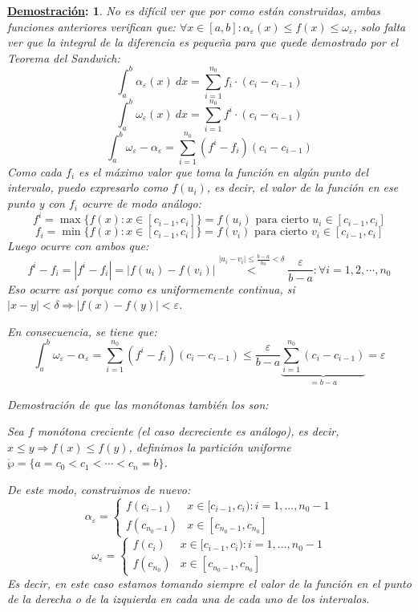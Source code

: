 \documentclass[10pt,a4paper,openright]{book}
\theoremstyle{break}
\newtheorem*{demo}{\underline{Demostración}:}
\newcommand{\dif}[1]{\ d#1}
\begin{document}
\begin{demo}
No es difícil ver que por como están construidas, ambas funciones anteriores verifican que: $\forall x\in[a,b]: \alpha_\varepsilon (x)\leq f(x)\leq \omega_\varepsilon$, solo falta ver que la integral de la diferencia es pequeña para que quede demostrado por el Teorema del Sandwich:
$$\int_{a}^{b}\alpha_\varepsilon(x) \dif{x} = \sum_{i = 1}^{n_0} f_i\cdot (c_i-c_{i-1})$$
$$\int_{a}^{b}\omega_\varepsilon(x) \dif{x} = \sum_{i = 1}^{n_0} f^i\cdot (c_i-c_{i-1})$$
$$\int_{a}^{b} \omega_\varepsilon - \alpha_\varepsilon = \sum_{i = 1}^{n_0} (f^i-f_i)(c_i-c_{i-1})$$
Como cada $f_i$ es el máximo valor que toma la función en algún punto del intervalo, puedo expresarlo como $f(u_i)$, es decir, el valor de la función en ese punto y con $f_i$ ocurre de modo análogo:
$$f^i = \max\{f(x): x\in [c_{i-1},c_{i}]\} =  f(u_i) \mbox{ para cierto } u_i\in [c_{i-1},c_{i}]$$
$$f_i = \min\{f(x): x\in [c_{i-1}, c_{i}]\} = f(v_i)\mbox{ para cierto } v_i\in [c_{i-1},c_{i}]$$
Luego ocurre con ambos que:
$$f^i-f_i = |f^i - f_i| = \left|f(u_i)- f(v_i)\right| \stackrel{|u_i-v_i|\leq \frac{b-a}{n_0}<\delta}{<} \frac{\varepsilon}{b-a}: \forall i = 1, 2,\cdots , n_0 $$
Eso ocurre así porque como es uniformemente continua, si $|x-y|<\delta\Rightarrow |f(x)-f(y)|<\varepsilon$.

En consecuencia, se tiene que:
$$\int_{a}^{b} \omega_\varepsilon - \alpha_\varepsilon = \sum_{i = 1}^{n_0} (f^i-f_i)(c_i-c_{i-1}) \leq \frac{\varepsilon}{b-a}\underbrace{\sum_{ i = 1}^{n_0} (c_i-c_{i-1})}_{=b-a} = \varepsilon$$

Demostración de que las monótonas también los son:

Sea $f$ monótona creciente (el caso decreciente es análogo), es decir, $x\leq y\Rightarrow f(x)\leq f(y)$, definimos la partición uniforme $\mathring{\wp} =\{a = c_0 < c_1 < \cdots < c_n = b\}$.

De este modo, construimos de nuevo:
$$\alpha_\varepsilon = \begin{cases} f(c_{i-1}) & x\in [c_{i-1}, c_i): i=1,..., n_0-1 \\ f(c_{n_0-1}) & x\in [c_{n_0-1}, c_{n_0}]\end{cases}$$
$$\omega_\varepsilon = \begin{cases} f(c_{i}) & x\in [c_{i-1}, c_i): i=1,..., n_0-1 \\ f(c_{n_0}) & x\in [c_{n_0-1}, c_{n_0}]\end{cases}$$
Es decir, en este caso estamos tomando siempre el valor de la función en el punto de la derecha o de la izquierda en cada una de cada uno de los intervalos.


\end{demo}
\end{document}
